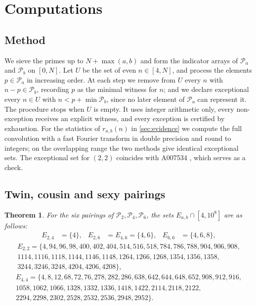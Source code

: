 \documentclass[11pt]{amsart}
\newtheorem{theorem}{Theorem}[section]
\theoremstyle{definition}
\theoremstyle{remark}
\newcommand{\PP}{\mathcal{P}}
\begin{document}
\section{Computations}\label{sec:computations}

\subsection{Method}
We sieve the primes up to $N+\max(a,b)$ and form the indicator arrays of $\PP_a$ and $\PP_b$ on $[0,N]$. Let $U$ be the set of even $n\in[4,N]$, and process the elements $p\in\PP_a$ in increasing order. At each step we remove from $U$ every $n$ with $n-p\in\PP_b$, recording $p$ as the minimal witness for $n$; and we declare exceptional every $n\in U$ with $n<p+\min\PP_b$, since no later element of $\PP_a$ can represent it. The procedure stops when $U$ is empty. It uses integer arithmetic only, every non-exception receives an explicit witness, and every exception is certified by exhaustion. For the statistics of $r_{a,b}(n)$ in \cref{sec:evidence} we compute the full convolution with a fast Fourier transform in double precision and round to integers; on the overlapping range the two methods give identical exceptional sets. The exceptional set for $(2,2)$ coincides with A007534 \cite{OEIS_A007534}, which serves as a check.

\subsection{Twin, cousin and sexy pairings}

\begin{theorem}\label{thm:six}
For the six pairings of $\PP_2,\PP_4,\PP_6$, the sets $E_{a,b}\cap[4,10^8]$ are as follows:
\begin{align*}
E_{2,4}&=\{4\}, & E_{2,6}&=E_{4,6}=\{4,6\}, & E_{6,6}&=\{4,6,8\},
\end{align*}
\begin{multline*}
E_{2,2}=\{4,94,96,98,400,402,404,514,516,518,784,786,788,904,906,908,\\1114,1116,1118,1144,1146,1148,1264,1266,1268,1354,1356,1358,\\3244,3246,3248,4204,4206,4208\},
\end{multline*}
\begin{multline*}
E_{4,4}=\{4,8,12,68,72,76,278,282,286,638,642,644,648,652,908,912,916,\\1058,1062,1066,1328,1332,1336,1418,1422,2114,2118,2122,\\2294,2298,2302,2528,2532,2536,2948,2952\}.
\end{multline*}
\end{theorem}
\end{document}
